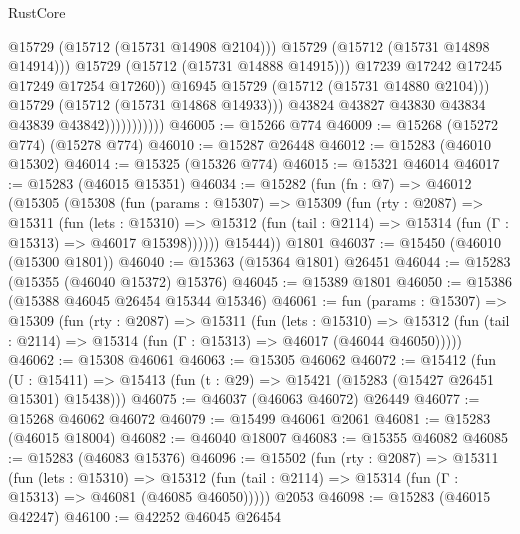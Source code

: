 \begin{lexlean}{RustCore}
\begin{coremodule}
                                        @15729
                                        (@15712 (@15731 @14908 @2104)))
                                      @15729
                                      (@15712 (@15731 @14898 @14914)))
                                    @15729
                                    (@15712 (@15731 @14888 @14915)))
                                  @17239
                                  @17242
                                  @17245
                                  @17249
                                  @17254
                                  @17260))
                              @16945
                              @15729
                              (@15712 (@15731 @14880 @2104)))
                            @15729
                            (@15712 (@15731 @14868 @14933)))
                          @43824
                          @43827
                          @43830
                          @43834
                          @43839
                          @43842)))))))))))
@46005 := @15266 @774
@46009 := @15268 (@15272 @774) (@15278 @774)
@46010 := @15287 @26448
@46012 := @15283 (@46010 @15302)
@46014 := @15325 (@15326 @774)
@46015 := @15321 @46014
@46017 := @15283 (@46015 @15351)
@46034 := @15282
    (fun (fn : @7) =>
    @46012
      (@15305
        (@15308
          (fun (params : @15307) =>
          @15309
            (fun (rty : @2087) =>
            @15311
              (fun (lets : @15310) =>
              @15312 (fun (tail : @2114) => @15314 (fun (Γ : @15313) => @46017 @15398))))))
        @15444))
    @1801
@46037 := @15450 (@46010 (@15300 @1801))
@46040 := @15363 (@15364 @1801) @26451
@46044 := @15283 (@15355 (@46040 @15372) @15376)
@46045 := @15389 @1801
@46050 := @15386 (@15388 @46045 @26454 @15344 @15346)
@46061 := fun (params : @15307) =>
  @15309
    (fun (rty : @2087) =>
    @15311
      (fun (lets : @15310) =>
      @15312 (fun (tail : @2114) => @15314 (fun (Γ : @15313) => @46017 (@46044 @46050)))))
@46062 := @15308 @46061
@46063 := @15305 @46062
@46072 := @15412
    (fun (U : @15411) => @15413 (fun (t : @29) => @15421 (@15283 (@15427 @26451 @15301) @15438)))
@46075 := @46037 (@46063 @46072) @26449
@46077 := @15268 @46062 @46072
@46079 := @15499 @46061 @2061
@46081 := @15283 (@46015 @18004)
@46082 := @46040 @18007
@46083 := @15355 @46082
@46085 := @15283 (@46083 @15376)
@46096 := @15502
    (fun (rty : @2087) =>
    @15311
      (fun (lets : @15310) =>
      @15312 (fun (tail : @2114) => @15314 (fun (Γ : @15313) => @46081 (@46085 @46050)))))
    @2053
@46098 := @15283 (@46015 @42247)
@46100 := @42252 @46045 @26454

\end{coremodule}
\end{lexlean}
